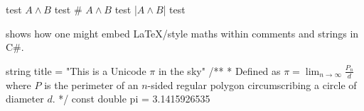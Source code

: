\begin{listing}[H]
  \begin{pythoncode}
test
$A \wedge B$
test
# $A \wedge B$
test
|$A \wedge B$|
test
  \end{pythoncode}
  \caption{Using math inside  environments.}
  \label{lst:mathMinted}
\end{listing}

 shows how one might embed \LaTeX\-/style maths within comments and strings in C\#.

\begin{listing}[H]
  \begin{csharpcode}
string title = "This is a Unicode $\pi$ in the sky"
/**
 * Defined as $\pi=\lim_{n\to\infty}\frac{P_n}{d}$ where $P$ is the perimeter of an $n$-sided regular polygon circumscribing a circle of diameter $d$.
 */
const double pi = 3.1415926535
  \end{csharpcode}
  \caption{Using mathematical notation in C\# code comments and strings.}
  \label{lst:csharpMath}
\end{listing}
